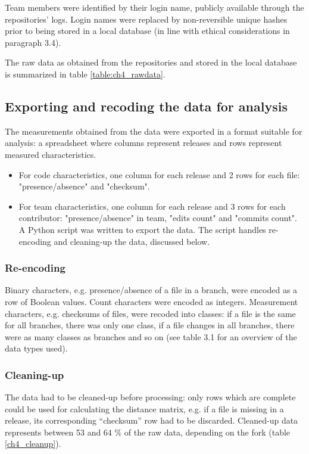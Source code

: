 Team members were identified by their login name, publicly available through the repositories’ logs. Login names were replaced by non-reversible unique hashes prior to being stored in a local database (in line with ethical considerations in paragraph 3.4).

The raw data as obtained from the repositories and stored in the local database is summarized in table \ref{table:ch4_rawdata}.



\subsection{Exporting and recoding the data for analysis}
The measurements obtained from the data were exported in a format suitable for analysis: a spreadsheet where columns represent releases and rows represent measured characteristics.

\begin{itemize}
\item{For code characteristics, one column for each release and 2 rows for each file: "presence/absence" and "checksum".}
\item{For team characteristics, one column for each release and 3 rows for each contributor: "presence/absence" in team, "edits count" and "commits count".
A Python script was written to export the data. The script handles re-encoding and cleaning-up the data, discussed below.}
\end{itemize}

\subsubsection{Re-encoding}
Binary characters, e.g. presence/absence of a file in a branch, were encoded as a row of Boolean values. Count characters were encoded as integers. Measurement characters, e.g. checksums of files, were recoded into classes: if a file is the same for all branches, there was only one class, if a file changes in all branches, there were as many classes as branches and so on (see table 3.1 for an overview of the data types used).

\subsubsection{Cleaning-up}
The data had to be cleaned-up before processing: only rows which are complete could be used for calculating the distance matrix, e.g. if a file is missing in a release, its corresponding “checksum” row had to be discarded. Cleaned-up data represents between 53 and 64 \% of the raw data, depending on the fork (table \ref{ch4_cleanup}).


